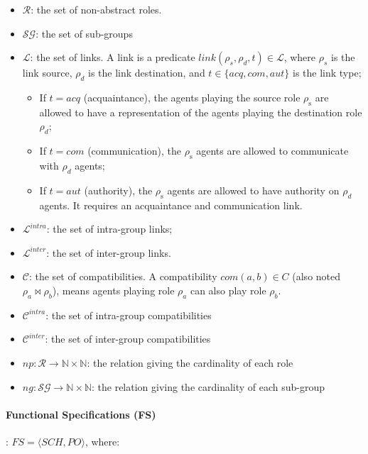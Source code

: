 \documentclass[runningheads]{llncs}
\begin{document}
\begin{itemize}
    \item $\mathcal{R}$: the set of non-abstract roles.
          
    \item $\mathcal{SG}$: the set of sub-groups
          
    \item $\mathcal{L}$: the set of links. A link is a predicate $link(\rho_s,\rho_d,t) \in \mathcal{L}$, where $\rho_{s}$ is the link source, $\rho_{d}$ is the link destination, and $t \in\{acq, com, aut\}$ is the link type;
          \begin{itemize}
              \item If $t = acq$ (acquaintance), the agents playing the source role $\rho_{\mathrm{s}}$ are allowed to have a representation of the agents playing the destination role $\rho_{d}$;
              \item If $t = com$ (communication), the $\rho_{\mathrm{s}}$ agents are allowed to communicate with $\rho_{d}$ agents;
              \item If $t = aut$ (authority), the $\rho_{\mathrm{s}}$ agents are allowed to have authority on $\rho_{d}$ agents. It requires an acquaintance and communication link.
          \end{itemize}
    \item $\mathcal{L}^{intra}$: the set of intra-group links;
    \item $\mathcal{L}^{inter}$: the set of inter-group links.
          
    \item $\mathcal{C}$: the set of compatibilities. A compatibility $com(a,b) \in C$ (also noted $\rho_a \bowtie \rho_b$), means agents playing role $\rho_a$ can also play role $\rho_b$.
    \item $\mathcal{C}^{intra}$: the set of intra-group compatibilities
    \item $\mathcal{C}^{inter}$: the set of inter-group compatibilities
          
    \item $np: \mathcal{R} \rightarrow \mathbb{N} \times \mathbb{N}$: the relation giving the cardinality of each role
    \item $ng: \mathcal{SG} \rightarrow \mathbb{N} \times \mathbb{N}$: the relation giving the cardinality of each sub-group
          
\end{itemize}

\paragraph{\textbf{Functional Specifications (FS)}}: $FS = \langle SCH, PO \rangle$, where:
\end{document}
